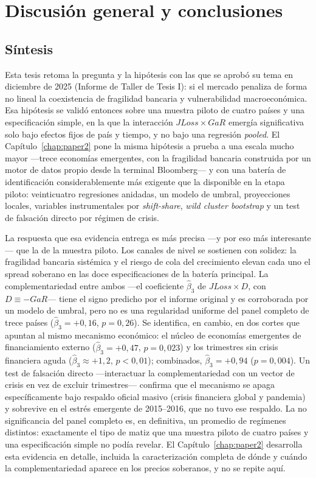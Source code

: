 \chapter{Discusión general y conclusiones}
\label{chap:discusion}

\section{Síntesis}

Esta tesis retoma la pregunta y la hipótesis con las que se aprobó su tema en diciembre de 2025 (Informe de Taller de Tesis I): si el mercado penaliza de forma no lineal la coexistencia de fragilidad bancaria y vulnerabilidad macroeconómica. Esa hipótesis se validó entonces sobre una muestra piloto de cuatro países y una especificación simple, en la que la interacción $JLoss\times GaR$ emergía significativa solo bajo efectos fijos de país y tiempo, y no bajo una regresión \textit{pooled}. El Capítulo~\ref{chap:paper2} pone la misma hipótesis a prueba a una escala mucho mayor —trece economías emergentes, con la fragilidad bancaria construida por un motor de datos propio desde la terminal Bloomberg— y con una batería de identificación considerablemente más exigente que la disponible en la etapa piloto: veinticuatro regresiones anidadas, un modelo de umbral, proyecciones locales, variables instrumentales por \textit{shift-share}, \textit{wild cluster bootstrap} y un test de falsación directo por régimen de crisis.

La respuesta que esa evidencia entrega es más precisa —y por eso más interesante— que la de la muestra piloto. Los canales de nivel se sostienen con solidez: la fragilidad bancaria sistémica y el riesgo de cola del crecimiento elevan cada uno el spread soberano en las doce especificaciones de la batería principal. La complementariedad entre ambos —el coeficiente $\hat\beta_3$ de $JLoss\times D$, con $D\equiv-GaR$— tiene el signo predicho por el informe original y es corroborada por un modelo de umbral, pero no es una regularidad uniforme del panel completo de trece países ($\hat\beta_3=+0{,}16$, $p=0{,}26$). Se identifica, en cambio, en dos cortes que apuntan al mismo mecanismo económico: el núcleo de economías emergentes de financiamiento externo ($\hat\beta_3=+0{,}47$, $p=0{,}023$) y los trimestres sin crisis financiera aguda ($\hat\beta_3\approx+1{,}2$, $p<0{,}01$); combinados, $\hat\beta_3=+0{,}94$ ($p=0{,}004$). Un test de falsación directo —interactuar la complementariedad con un vector de crisis en vez de excluir trimestres— confirma que el mecanismo se apaga específicamente bajo respaldo oficial masivo (crisis financiera global y pandemia) y sobrevive en el estrés emergente de 2015--2016, que no tuvo ese respaldo. La no significancia del panel completo es, en definitiva, un promedio de regímenes distintos: exactamente el tipo de matiz que una muestra piloto de cuatro países y una especificación simple no podía revelar. El Capítulo~\ref{chap:paper2} desarrolla esta evidencia en detalle, incluida la caracterización completa de dónde y cuándo la complementariedad aparece en los precios soberanos, y no se repite aquí.

